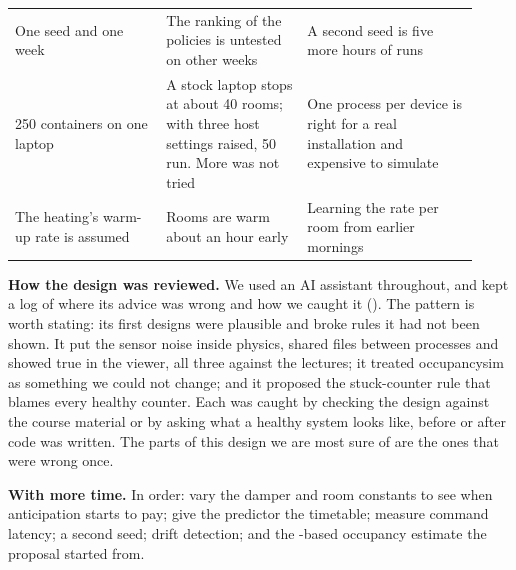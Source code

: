 \begin{longtable}[]{@{}L{0.30\linewidth}L{0.28\linewidth}L{0.34\linewidth}@{}}
One seed and one week & The ranking of the policies is untested on other weeks & A second seed is five more hours of runs \\
250 containers on one laptop & A stock laptop stops at about 40 rooms; with three host settings raised, 50 run. More was not tried & One process per device is right for a real installation and expensive to simulate \\
The heating's warm-up rate is assumed & Rooms are warm about an hour early & Learning the rate per room from earlier mornings \\
\bottomrule
\end{longtable}

\textbf{How the design was reviewed.} We used an AI assistant throughout, and
kept a log of where its advice was wrong and how we caught it
(). The pattern is worth stating: its first designs
were plausible and broke rules it had not been shown. It put the sensor noise
inside physics, shared files between processes and showed true \COtwo{} in the
viewer, all three against the lectures; it treated occupancysim as something
we could not change; and it proposed the stuck-counter rule that blames every
healthy counter. Each was caught by checking the design against the course
material or by asking what a healthy system looks like, before or after code
was written. The parts of this design we are most sure of are the ones that
were wrong once.


\textbf{With more time.} In order: vary the damper and room constants to see
when anticipation starts to pay; give the predictor the timetable; measure
command latency; a second seed; drift detection; and the \COtwo{}-based
occupancy estimate the proposal started from.
